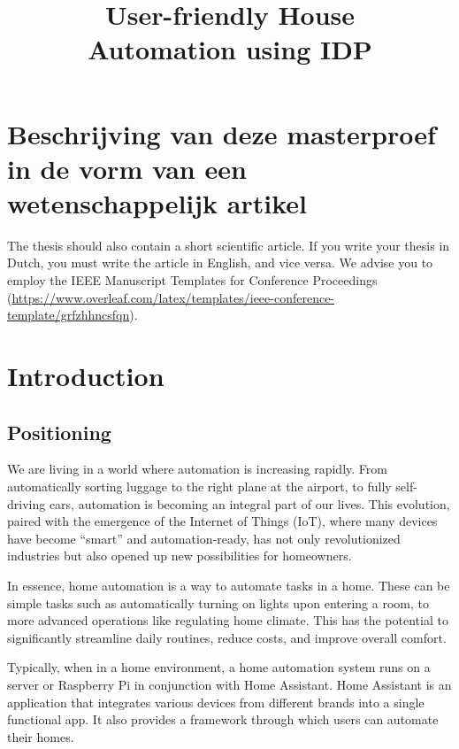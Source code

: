 \documentclass[11pt,a4paper]{report}
\title{User-friendly House\\ Automation using IDP}
\subtitle{}
\begin{document}
\preface%

\printnoidxglossary[type=\acronymtype]%
\clearpage

%
%
%




\chapter{Beschrijving van deze masterproef in de vorm van een wetenschappelijk artikel}
The thesis should also contain a short scientific article. If you write your thesis in Dutch, you must write the article in English, and vice versa. We advise you to employ the IEEE Manuscript Templates for Conference Proceedings (\url{https://www.overleaf.com/latex/templates/ieee-conference-template/grfzhhncsfqn}).

\chapter{Introduction}
\section{Positioning}
We are living in a world where automation is increasing rapidly. From automatically sorting luggage to the right plane at the airport, to fully self-driving cars, automation is becoming an integral part of our lives. This evolution, paired with the emergence of the Internet of Things (IoT), where many devices have become ``smart'' and automation-ready, has not only revolutionized industries but also opened up new possibilities for homeowners.

In essence, home automation is a way to automate tasks in a home. These can be simple tasks such as automatically turning on lights upon entering a room, to more advanced operations like regulating home climate. This has the potential to significantly streamline daily routines, reduce costs, and improve overall comfort.

Typically, when in a home environment, a home automation system runs on a server or Raspberry Pi in conjunction with Home Assistant. Home Assistant is an application that integrates various devices from different brands into a single functional app. It also provides a framework through which users can automate their homes.
\end{document}
